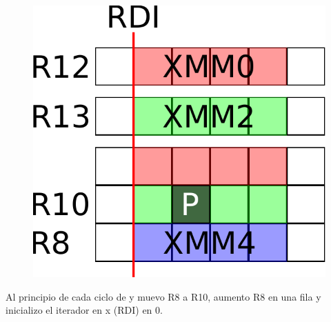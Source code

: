 \begin{figure}[h!]
	\centering
	\includegraphics[scale=0.5]{images/BlurASM1_0}
\end{figure}

Al principio de cada ciclo de y muevo R8 a R10, aumento R8 en una fila y inicializo el iterador en x (RDI) en 0.

